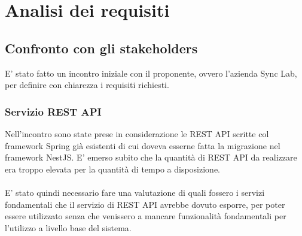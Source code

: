 
\chapter{Analisi dei requisiti}
\label{cap:analisi-requisiti}

\section{Confronto con gli stakeholders}
E' stato fatto un incontro iniziale con il proponente, ovvero l'azienda Sync Lab,
per definire con chiarezza i requisiti richiesti.
\subsection{Servizio REST API}
Nell'incontro sono state prese in considerazione le REST API scritte col framework Spring 
già esistenti di cui doveva esserne fatta la migrazione nel framework NestJS.
E' emerso subito che la quantità di REST API da realizzare era troppo elevata per la
quantità di tempo a disposizione. 
\\\\
E' stato quindi necessario fare una valutazione di quali fossero i servizi fondamentali che
il servizio di REST API avrebbe dovuto esporre, per poter essere utilizzato senza che venissero
a mancare funzionalità fondamentali per l'utilizzo a livello base del sistema.

